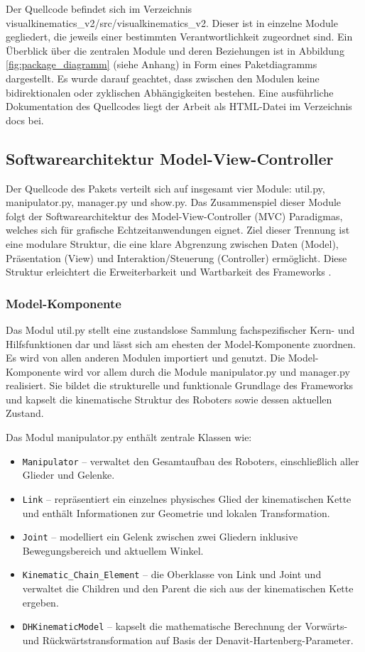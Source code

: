 Der Quellcode befindet sich im Verzeichnis visualkinematics\_v2/src/visual\-ki\-ne\-ma\-tics\_v2.
Dieser ist in einzelne Module gegliedert, die jeweils einer bestimmten Verantwortlichkeit zugeordnet sind. 
Ein Überblick über die zentralen Module und deren Beziehungen ist in Abbildung \ref{fig:package_diagramm} (siehe Anhang) in Form eines Paketdiagramms dargestellt. 
Es wurde darauf geachtet, dass zwischen den Modulen keine bidirektionalen oder zyklischen Abhängigkeiten bestehen.
Eine ausführliche Dokumentation des Quellcodes liegt der Arbeit als HTML-Datei im Verzeichnis docs bei.

\subsection{Softwarearchitektur Model-View-Controller}
Der Quellcode des Pakets verteilt sich auf insgesamt vier Module: util.py, manipulator.py, manager.py und show.py.
Das Zusammenspiel dieser Module folgt der Softwarearchitektur des Model-View-Controller (MVC) Paradigmas,
welches sich für grafische Echtzeitanwendungen eignet.
Ziel dieser Trennung ist eine modulare Struktur, die eine klare Abgrenzung zwischen Daten (Model),
Präsentation (View) und Interaktion/Steuerung (Controller) ermöglicht.
Diese Struktur erleichtert die Erweiterbarkeit und Wartbarkeit des Frameworks .




\subsubsection{Model-Komponente}
Das Modul util.py stellt eine zustandslose Sammlung fachspezifischer Kern- und Hilfsfunktionen dar und lässt sich am ehesten der Model-Komponente zuordnen.
Es wird von allen anderen Modulen importiert und genutzt.
Die Model-Komponente wird vor allem durch die Module manipulator.py und manager.py realisiert.  
Sie bildet die strukturelle und funktionale Grundlage des Frameworks und kapselt die kinematische Struktur des Roboters sowie dessen aktuellen Zustand.

Das Modul manipulator.py enthält zentrale Klassen wie:

\begin{itemize}
    \item \texttt{Manipulator} – verwaltet den Gesamtaufbau des Roboters, einschließlich aller Glieder und Gelenke.
    \item \texttt{Link} – repräsentiert ein einzelnes physisches Glied der kinematischen Kette und enthält Informationen zur Geometrie und lokalen Transformation.
    \item \texttt{Joint} – modelliert ein Gelenk zwischen zwei Gliedern inklusive Bewegungsbereich und aktuellem Winkel.
    \item \texttt{Kinematic\_Chain\_Element} – die Oberklasse von Link und Joint und verwaltet die Children und den Parent die sich aus der kinematischen Kette ergeben.
    \item \texttt{DHKinematicModel} – kapselt die mathematische Berechnung der Vorwärts- und Rückwärtstransformation auf Basis der Denavit-Hartenberg-Parameter.
\end{itemize}

